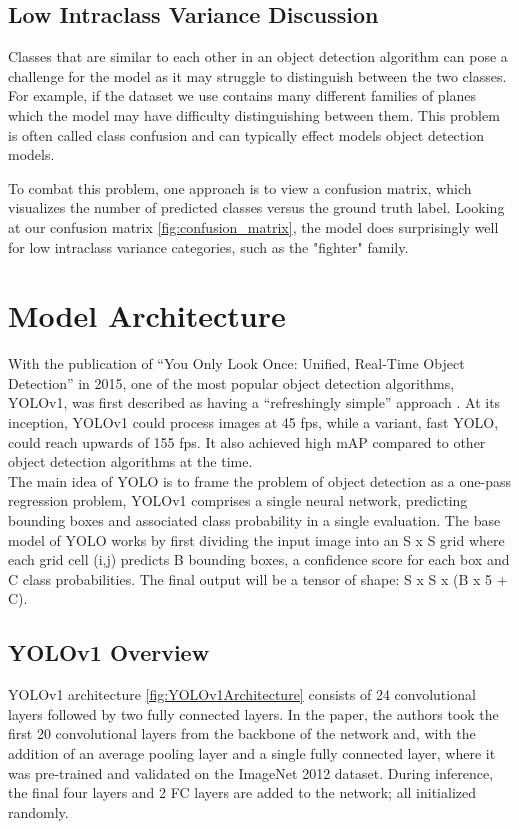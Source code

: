\documentclass[10pt,twocolumn,letterpaper]{article}
\begin{document}
\subsection{Low Intraclass Variance Discussion}
Classes that are similar to each other in an object detection algorithm can pose a challenge for the model as it may struggle to distinguish between the two classes. For example, if the dataset we use contains many different families of planes which the model may have difficulty distinguishing between them. This problem is often called class confusion and can typically effect models object detection models.

To combat this problem, one approach is to view a confusion matrix, which visualizes the number of predicted classes versus the ground truth label. Looking at our confusion matrix \ref{fig:confusion_matrix}, the model does surprisingly well for low intraclass variance categories, such as the "fighter" family. 


\section{Model Architecture}
With the publication of “You Only Look Once: Unified, Real-Time Object Detection” \cite{YOLO_OG} in 2015, one of the most popular object detection algorithms, YOLOv1, was first described as having a “refreshingly simple” approach \cite{CompReview}. At its inception, YOLOv1 could process images at 45 fps, while a variant, fast YOLO, could reach upwards of 155 fps. It also achieved high mAP compared to other object detection algorithms at the time.\\
\indent The main idea of YOLO is to frame the problem of object detection as a one-pass regression problem, YOLOv1 comprises a single neural network, predicting bounding boxes and associated class probability in a single evaluation. The base model of YOLO works by first dividing the input image into an S x S grid where each grid cell (i,j) predicts B bounding boxes, a confidence score for each box and C class probabilities. The final output will be a tensor of shape: S x S x (B x 5 + C).

\subsection{YOLOv1 Overview}
YOLOv1 architecture \ref{fig:YOLOv1Architecture} consists of 24 convolutional layers followed by two fully connected layers. In the paper, the authors took the first 20 convolutional layers from the backbone of the network and, with the addition of an average pooling layer and a single fully connected layer, where it was pre-trained and validated on the ImageNet 2012 dataset. During inference, the final four layers and 2 FC layers are added to the network; all initialized randomly.
\end{document}
